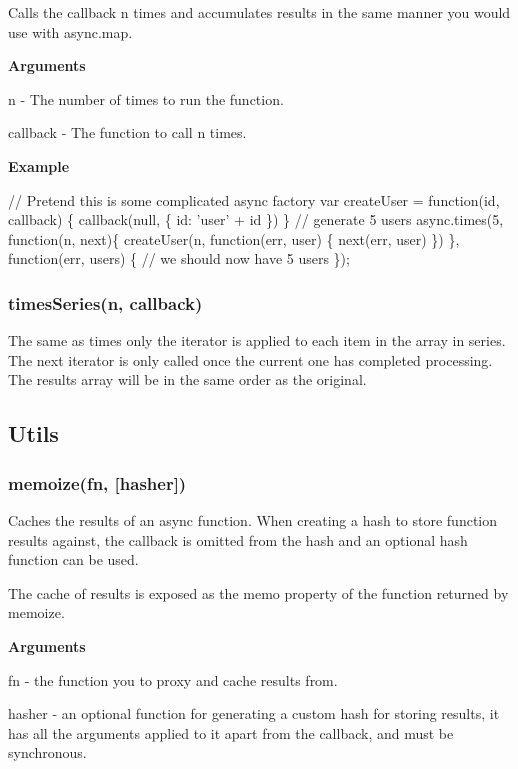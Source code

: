Calls the callback n times and accumulates results in the same manner you would use with async.\+map.

{\bfseries Arguments}


\begin{DoxyItemize}
\item n -\/ The number of times to run the function.
\item callback -\/ The function to call n times.
\end{DoxyItemize}

{\bfseries Example}


\begin{DoxyCode}
// Pretend this is some complicated async factory
var createUser = function(id, callback) \{
  callback(null, \{
    id: 'user' + id
  \})
\}
// generate 5 users
async.times(5, function(n, next)\{
    createUser(n, function(err, user) \{
      next(err, user)
    \})
\}, function(err, users) \{
  // we should now have 5 users
\});
\end{DoxyCode}


\label{_timesSeries}%
 \subsubsection*{times\+Series(n, callback)}

The same as times only the iterator is applied to each item in the array in series. The next iterator is only called once the current one has completed processing. The results array will be in the same order as the original.

\subsection*{Utils}

\label{_memoize}%
 \subsubsection*{memoize(fn, \mbox{[}hasher\mbox{]})}

Caches the results of an async function. When creating a hash to store function results against, the callback is omitted from the hash and an optional hash function can be used.

The cache of results is exposed as the {\ttfamily memo} property of the function returned by {\ttfamily memoize}.

{\bfseries Arguments}


\begin{DoxyItemize}
\item fn -\/ the function you to proxy and cache results from.
\item hasher -\/ an optional function for generating a custom hash for storing results, it has all the arguments applied to it apart from the callback, and must be synchronous.
\end{DoxyItemize}

